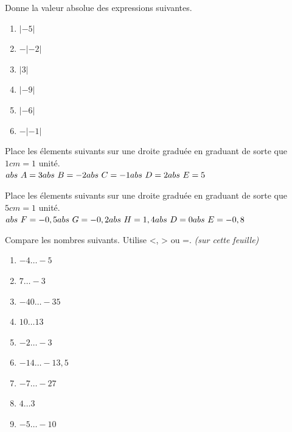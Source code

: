 \documentclass[../../syllabus_1.tex]{subfiles}
\begin{document}
\begin{exercise}
    Donne la valeur absolue des expressions suivantes.
    \begin{enumerate}[cols=3]
        \item $|-5|$
        \item $-|-2|$
        \item $|3|$
        \item $|-9|$
        \item $|-6|$
        \item $-|-1|$
    \end{enumerate}
\end{exercise}

 \begin{exercise}
     Place les élements suivants sur une droite graduée en graduant de sorte que $1cm = 1$ unité. \\

     $\hfil abs~A = 3 \hfil abs~B=-2 \hfil abs~C=-1 \hfil abs~D=2 \hfil abs~E=5$
 \end{exercise}

 \begin{exercise}
    Place les élements suivants sur une droite graduée en graduant de sorte que $5cm = 1$ unité. \\
    
    $\hfil abs~F = -0,5 \hfil abs~G=-0,2 \hfil abs~H=1,4 \hfil abs~D=0 \hfil abs~E=-0,8$
\end{exercise}

\begin{exercise}
    Compare les nombres suivants. Utilise <, > ou =. \emph{(sur cette feuille)}
    \begin{enumerate}[cols=3, label=\ ]
        \item $-4 \ldots -5$
        \item $7\ldots-3$
        \item $-40\ldots-35$
        \item $10\ldots 13$
        \item $-2\ldots-3$
        \item $-14\ldots-13,5$
        \item $-7\ldots-27$
        \item $4\ldots 3$
        \item $-5 \ldots -10$
    \end{enumerate}
\end{exercise}
\end{document}
